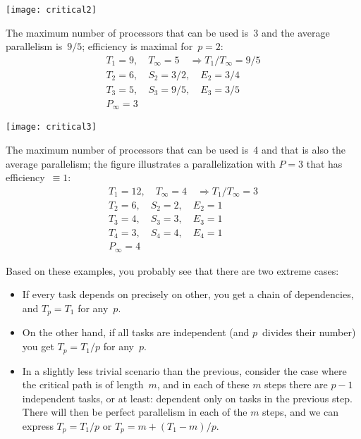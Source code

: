 \begin{minipage}{\textwidth}
  \begin{minipage}{.25\textwidth}
    \texttt{[image: critical2]}
  \end{minipage}
  \begin{minipage}{.75\textwidth}
    The maximum number of processors that can be used is~3 and the
    average parallelism is~$9/5$; efficiency is maximal for~$p=2$:
    \[
    \begin{array}{l}
      T_1=9,\quad T_\infty=5 \quad\Rightarrow T_1/T_\infty=9/5\\
      T_2=6,\quad S_2=3/2,\quad E_2=3/4\\
      T_3=5,\quad S_3=9/5,\quad E_3=3/5\\
      P_\infty=3
    \end{array}
    \]
  \end{minipage}
\end{minipage}

\begin{minipage}{\textwidth}
  \begin{minipage}{.4\textwidth}
    \texttt{[image: critical3]}
  \end{minipage}
  \begin{minipage}{.6\textwidth}
    The maximum number of processors that can be used is~4
    and that is also the average parallelism;
    the figure illustrates a parallelization with $P=3$ that
    has efficiency~$\equiv1$:
    \[
    \begin{array}{l}
      T_1=12,\quad T_\infty=4 \quad\Rightarrow T_1/T_\infty=3\\
      T_2=6,\quad S_2=2,\quad E_2=1\\
      T_3=4,\quad S_3=3,\quad E_3=1\\
      T_4=3,\quad S_4=4,\quad E_4=1\\
      P_\infty=4
    \end{array}
    \]
  \end{minipage}
\end{minipage}

Based on these examples, you probably see that there are two extreme cases:
\begin{itemize}
\item If every task depends on precisely on other, you get a chain
  of dependencies, and $T_p=T_1$ for any~$p$.
\item On the other hand, if all tasks are independent (and $p$~divides
  their number) you get $T_p=T_1/p$ for any~$p$.
\item In a slightly less trivial scenario than the previous,
  consider the case where
  the critical path is of length~$m$, and in each of these $m$ steps
  there are $p-1$ independent tasks, or at least: dependent only on
  tasks in the previous step. There will then be perfect parallelism
  in each of the $m$ steps, and we can express $T_p = T_1/p$
  or $T_p= m+ (T_1-m)/p$.
\end{itemize}

